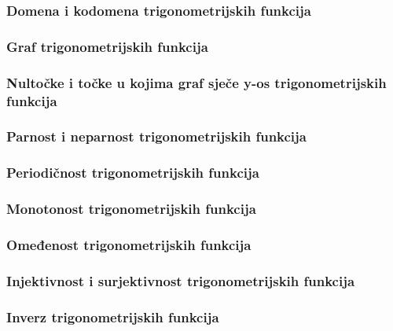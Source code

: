 \newcommand{\trig}{trigonometrijskih funkcija}

\subsubsection{Domena i kodomena \trig}
\subsubsection{Graf \trig}
\subsubsection{Nultočke i točke u kojima graf sječe y-os \trig}
\subsubsection{Parnost i neparnost \trig}
\subsubsection{Periodičnost \trig}
\subsubsection{Monotonost \trig}
\subsubsection{Omeđenost \trig}
\subsubsection{Injektivnost i surjektivnost \trig}
\subsubsection{Inverz \trig}